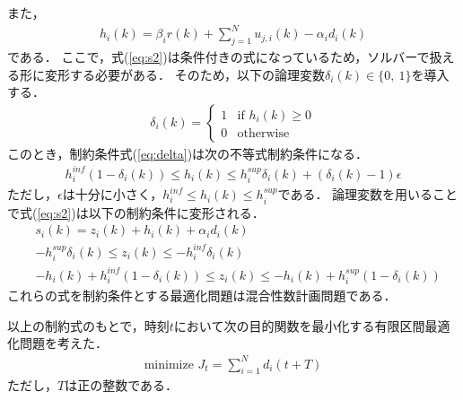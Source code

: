 \documentclass[a4j,9pt,twocolumn]{paper}
\begin{document}
また，
\begin{align}
 h_i(k)=\beta_i r(k) +\sum_{j=1}^{N}u_{j,i}(k) -\alpha_i d_i(k) \label{eq:h}
\end{align}
である．
ここで，式(\ref{eq:s2})は条件付きの式になっているため，ソルバーで扱える形に変形する必要がある．
そのため，以下の論理変数$\delta_i(k) \in \{ 0,\ 1\}$を導入する．
\begin{align}
 \delta_i(k)=
\left\{ \begin{array}{ll}
1 & \mbox{if }h_i(k)\geq 0 \\
0 & \mbox{otherwise}
\end{array} \right. \label{eq:delta}
\end{align}
このとき，制約条件式(\ref{eq:delta})は次の不等式制約条件になる．
\begin{align}
 h^{inf}_{i}(1-\delta_i(k))\leq h_i(k) \leq h^{sup}_{i} \delta_i(k)+(\delta_i(k) -1) \epsilon \label{eq:delta_new}
\end{align}
ただし，$\epsilon$は十分に小さく，$h^{inf}_{i}\leq h_i(k)\leq h^{sup}_{i}$である．
論理変数を用いることで式(\ref{eq:s2})は以下の制約条件に変形される．
\begin{align}
& s_i(k) = z_i(k)+h_i(k)+\alpha_i d_i(k)\\
& -h^{sup}_{i} \delta_i(k) \leq z_i(k) \leq -h^{inf}_{i} \delta_i(k)\\
& -h_i(k)+h^{inf}_i (1-\delta_i(k)) \leq z_i(k) \leq -h_i(k)+h^{sup}_i (1-\delta_i(k))
\end{align}
これらの式を制約条件とする最適化問題は混合性数計画問題である．

\par
以上の制約式のもとで，時刻$t$において次の目的関数を最小化する有限区間最適化問題を考えた．
\begin{align}
\mbox{minimize }J_t=\sum_{i=1}^{N}d_i(t+T) \label{eq:ob_function}
\end{align}
ただし，$T$は正の整数である．
\end{document}
